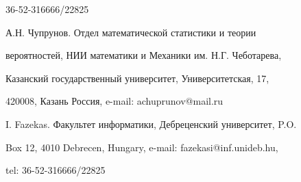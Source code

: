 \documentclass{article}
\begin{document}
36-52-316666/22825
















\bigskip














А.Н. Чупрунов. Отдел математической статистики и теории


вероятностей, НИИ математики и Механики им. Н.Г. Чеботарева,


Казанский государственный университет, Университетская, 17,


420008, Казань Россия, e-mail: achuprunov@mail.ru





I. Fazekas. Факультет информатики, Дебреценский университет, P.O.


Box 12, 4010 Debrecen, Hungary, e-mail: fazekasi@inf.unideb.hu,


tel: 36-52-316666/22825
\end{document}
